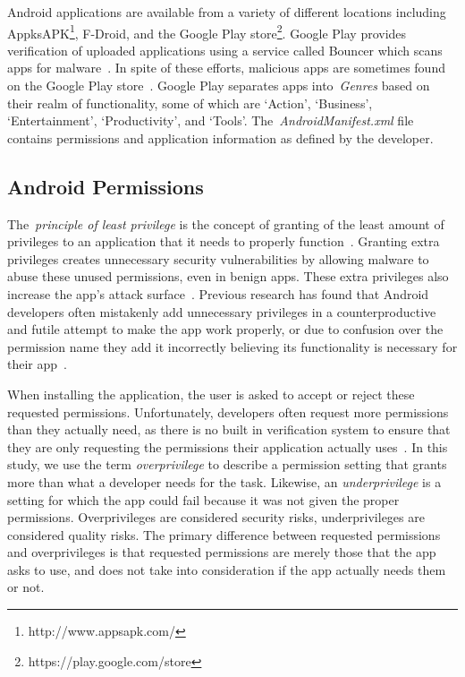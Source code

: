 \documentclass{sig-alternate}
\begin{document}
Android applications are available from a variety of different locations including AppksAPK\footnote{http://www.appsapk.com/}, F-Droid, and the Google Play store\footnote{https://play.google.com/store}. Google Play provides verification of uploaded applications using a service called Bouncer which scans apps for malware~\cite{bouncer_url1}. In spite of these efforts, malicious apps are sometimes found on the Google Play store~\cite{Zhou:2012:DAM:2310656.2310710}. Google Play separates apps into~\emph{Genres} based on their realm of functionality, some of which are `Action', `Business', `Entertainment', `Productivity', and `Tools'. The~\emph{AndroidManifest.xml} file contains permissions and application information as defined by the developer.

\subsection{Android Permissions}
The~\emph{principle of least privilege} is the concept of granting of the least amount of privileges to an application that it needs to properly function~\cite{saltzer1975protection}. Granting extra privileges creates unnecessary security vulnerabilities by allowing malware to abuse these unused permissions, even in benign apps. These extra privileges also increase the app's attack surface~\cite{Davi:2010:PEA:1949317.1949356, Bartel:2012:ASP:2351676.2351722}. Previous research has found that Android developers often mistakenly add unnecessary privileges in a counterproductive and futile attempt to make the app work properly, or due to confusion over the permission name they add it incorrectly believing its functionality is necessary for their app~\cite{Felt:2011:APD:2046707.2046779}.


When installing the application, the user is asked to accept or reject these requested permissions. Unfortunately, developers often request more permissions than they actually need, as there is no built in verification system to ensure that they are only requesting the permissions their application actually uses~\cite{Felt:2011:APD:2046707.2046779}. In this study, we use the term \emph{overprivilege} to describe a permission setting that grants more than what a developer needs for the task. Likewise, an \emph{underprivilege} is a setting for which the app could fail because it was not given the proper permissions. Overprivileges are considered security risks, underprivileges are considered quality risks. The primary difference between requested permissions and overprivileges is that requested permissions are merely those that the app asks to use, and does not take into consideration if the app actually needs them or not.
\end{document}
